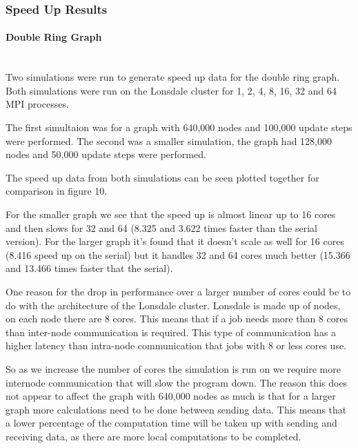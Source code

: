 \documentclass[pdftex,12pt,a4paper]{article}
\begin{document}
\subsubsection{Speed Up Results}


\paragraph{Double Ring Graph} ~\\

Two simulations were run to generate speed up data for the double ring graph. Both simulations were run on the Lonsdale cluster for 1, 2, 4, 8, 16, 32 and 64 MPI processes.

The first simultaion was for a graph with 640,000 nodes and 100,000 update steps were performed. The second was a smaller simulation, the graph had 128,000 nodes and 50,000 update steps were performed.

The speed up data from both simulations can be seen plotted together for comparison in figure 10.

For the smaller graph we see that the speed up is almost linear up to 16 cores and then slows for 32 and 64 (8.325 and 3.622 times faster than the serial version). For the larger graph it's found that it doesn't scale as well for 16 cores (8.416 speed up on the serial) but it handles 32 and 64 cores much better (15.366 and 13.466 times faster that the serial).

One reason for the drop in performance over a larger number of cores could be to do with the architecture of the Lonsdale cluster. Lonsdale is made up of nodes, on each node there are 8 cores. This means that if a job needs more than 8 cores than inter-node communication is required. This type of communication has a higher latency than intra-node communication that jobs with 8 or less cores use.

So as we increase the number of cores the simulation is run on we require more internode communication that will slow the program down. The reason this does not appear to affect the graph with 640,000 nodes as much is that for a larger graph more calculations need to be done between sending data. This means that a lower percentage of the computation time will be taken up with sending and receiving data, as there are more local computations to be completed.
\end{document}
